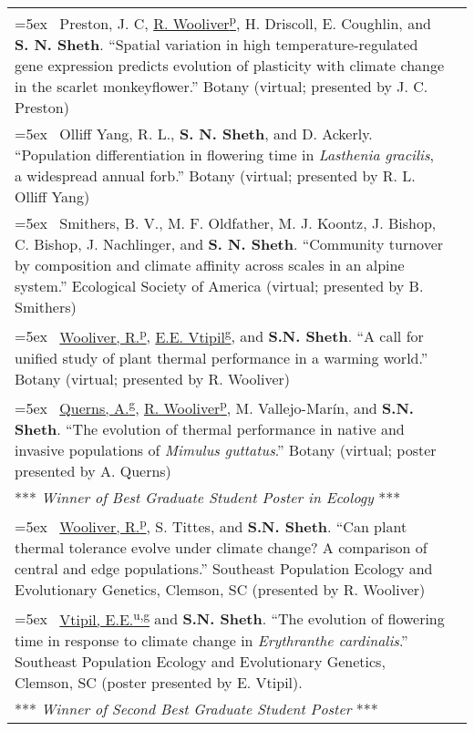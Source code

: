 \documentclass[11pt,english]{article}\usepackage[]{graphicx}\usepackage[]{color}
\providecommand{\tabularnewline}{\\}
\begin{document}
\renewcommand{\arraystretch}{1.2}
\begin{tabularx}{\textwidth}{@{}>{\raggedright}p{5.25in} >{\raggedleft}X@{}}

\hangindent=5ex \ Preston, J. C, \underline{R. Wooliver\textsuperscript{p}}, H. Driscoll, E. Coughlin, and \textbf{S. N. Sheth}. ``Spatial variation in high temperature-regulated gene expression predicts evolution of plasticity with climate change in the scarlet monkeyflower.'' Botany (virtual; presented by J. C. Preston) & 2021 \tabularnewline

\hangindent=5ex \ Olliff Yang, R. L., \textbf{S. N. Sheth}, and D. Ackerly. ``Population differentiation in flowering time in \emph{Lasthenia gracilis}, a widespread annual forb.'' Botany (virtual; presented by R. L. Olliff Yang) & 2021 \tabularnewline

\hangindent=5ex \ Smithers, B. V., M. F. Oldfather, M. J. Koontz, J. Bishop, C. Bishop, J. Nachlinger, and \textbf{S. N. Sheth}. ``Community turnover by composition and climate affinity across scales in an alpine system.'' Ecological Society of America (virtual; presented by B. Smithers) & 2020 \tabularnewline

\hangindent=5ex \ \underline{Wooliver, R.\textsuperscript{p}}, \underline{E.E. Vtipil\textsuperscript{g}}, and \textbf{S.N. Sheth}. ``A call for unified study of plant thermal performance in a warming world.'' Botany (virtual; presented by R. Wooliver) & 2020 \tabularnewline

\hangindent=5ex \ \underline{Querns, A.\textsuperscript{g}}, \underline{R. Wooliver\textsuperscript{p}}, M. Vallejo-Mar\'in, and \textbf{S.N. Sheth}. ``The evolution of thermal performance in native and invasive populations of \emph{Mimulus guttatus}.'' Botany (virtual; poster presented by A. Querns) & 2020 \tabularnewline
\hspace{7mm} *** \emph{Winner of Best Graduate Student Poster in Ecology} *** \tabularnewline

\hangindent=5ex \ \underline{Wooliver, R.\textsuperscript{p}}, S. Tittes, and \textbf{S.N. Sheth}. ``Can plant thermal tolerance evolve under climate change? A comparison of central and edge populations.'' Southeast Population Ecology and Evolutionary Genetics, Clemson, SC (presented by R. Wooliver) & 2019 \tabularnewline

\hangindent=5ex \ \underline{Vtipil, E.E.\textsuperscript{u,g}} and \textbf{S.N. Sheth}. ``The evolution of flowering time in response to climate change in \emph{Erythranthe cardinalis}.'' Southeast Population Ecology and Evolutionary Genetics, Clemson, SC (poster presented by E. Vtipil). & 2019 \tabularnewline
\hspace{7mm} *** \emph{Winner of Second Best Graduate Student Poster} *** \tabularnewline


\end{tabularx}
\end{document}
